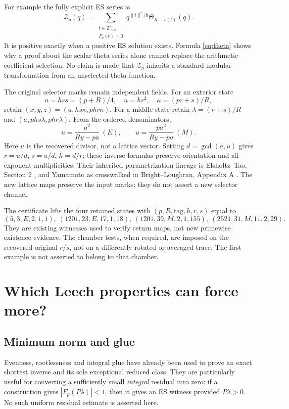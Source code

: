 \documentclass[11pt,reqno]{amsart}
\theoremstyle{definition}\newtheorem{definition}[theorem]{Definition}
\theoremstyle{remark}\newtheorem{remark}[theorem]{Remark}
\newcommand{\Z}{\mathbb Z}\newcommand{\Q}{\mathbb Q}\newcommand{\R}{\mathbb R}\newcommand{\F}{\mathbb F}
\begin{document}
For example the fully explicit ES series is
\[
\mathcal Z_p(q)=\sum_{\substack{t\in\Z_{>0}^3\\F_p(t)=0}}
 q^{\|t\|^2/8}\Theta_{K+r(t)}(q).
\]
It is positive exactly when a positive ES solution exists. Formula \eqref{eq:theta} shows why a proof about the scalar theta series alone cannot replace the arithmetic coefficient selection. No claim is made that $\mathcal Z_p$ inherits a standard modular transformation from an unselected theta function.

The original selector marks remain independent fields. For an exterior state
\[
a=hrs=(p+R)/4,\quad u=hr^2,\quad\kappa=(pr+s)/R,
\]
retain $(x,y,z)=(a,hs\kappa,phr\kappa)$. For a middle state retain $\lambda=(r+s)/R$ and $(a,phs\lambda,phr\lambda)$. From the ordered denominators,
\[
u=\frac{a^2}{Ry-pa}\ (E),\qquad
u=\frac{pa^2}{Ry-pa}\ (M).
\]
Here $u$ is the recovered divisor, not a lattice vector. Setting $d=\gcd(a,u)$ gives $r=u/d$, $s=a/d$, $h=d/r$; these inverse formulas preserve orientation and all exponent multiplicities. Their inherited parametrization lineage is Elsholtz--Tao, Section 2 \cite{ET}, and Yamamoto as crosswalked in Bright--Loughran, Appendix A \cite{BL}. The new lattice maps preserve the input marks; they do not assert a new selector channel.

The certificate lifts the four retained states with $(p,R,\mathrm{tag},h,r,s)$ equal to
\[
(5,3,E,2,1,1),\ (1201,23,E,17,1,18),\
(1201,39,M,2,1,155),\ (2521,31,M,11,2,29).
\]
They are existing witnesses used to verify return maps, not new primewise existence evidence. The chamber tests, when required, are imposed on the recovered original $r/s$, not on a differently rotated or averaged trace. The first example is not asserted to belong to that chamber.

\section{Which Leech properties can force more?}
\subsection{Minimum norm and glue}
Evenness, rootlessness and integral glue have already been used to prove an exact shortest inverse and its sole exceptional reduced class. They are particularly useful for converting a sufficiently small \emph{integral} residual into zero: if a construction gives $|F_p(P\lambda)|<1$, then it gives an ES witness provided $P\lambda>0$. No such uniform residual estimate is asserted here.
\end{document}
